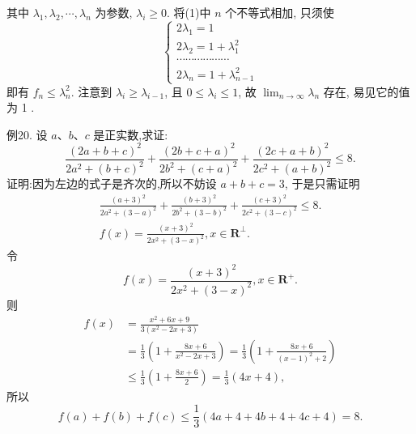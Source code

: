 其中 $\lambda_1, \lambda_2, \cdots, \lambda_n$ 为参数, $\lambda_i \geqslant 0$.
将(1)中 $n$ 个不等式相加, 只须使
$$
\left\{\begin{array}{l}
2 \lambda_1=1 \\
2 \lambda_2=1+\lambda_1^2 \\
\cdots \cdots \cdots \cdots \cdots \cdots \\
2 \lambda_n=1+\lambda_{n-1}^2
\end{array}\right. \label{(2)}
$$
即有 $f_n \leqslant \lambda_n^2$.
注意到 $\lambda_i \geqslant \lambda_{i-1}$, 且 $0 \leqslant \lambda_i \leqslant 1$, 故 $\lim _{n \rightarrow \infty} \lambda_n$ 存在, 易见它的值为 1 .



例20. 设 $a 、 b 、 c$ 是正实数,求证:
$$
\frac{(2 a+b+c)^2}{2 a^2+(b+c)^2}+\frac{(2 b+c+a)^2}{2 b^2+(c+a)^2}+\frac{(2 c+a+b)^2}{2 c^2+(a+b)^2} \leqslant 8 .
$$
证明:因为左边的式子是齐次的,所以不妨设 $a+b+c=3$, 于是只需证明
$$
\begin{gathered}
\frac{(a+3)^2}{2 a^2+(3-a)^2}+\frac{(b+3)^2}{2 b^2+(3-b)^2}+\frac{(c+3)^2}{2 c^2+(3-c)^2} \leqslant 8 . \\
f(x)=\frac{(x+3)^2}{2 x^2+(3-x)^2}, x \in \mathbf{R}^{\perp} .
\end{gathered}
$$
令
$$
f(x)=\frac{(x+3)^2}{2 x^2+(3-x)^2}, x \in \mathbf{R}^{+} .
$$
则
$$
\begin{aligned}
f(x) & =\frac{x^2+6 x+9}{3\left(x^2-2 x+3\right)} \\
& =\frac{1}{3}\left(1+\frac{8 x+6}{x^2-2 x+3}\right)=\frac{1}{3}\left(1+\frac{8 x+6}{(x-1)^2+2}\right) \\
& \leqslant \frac{1}{3}\left(1+\frac{8 x+6}{2}\right)=\frac{1}{3}(4 x+4),
\end{aligned}
$$
所以
$$
f(a)+f(b)+f(c) \leqslant \frac{1}{3}(4 a+4+4 b+4+4 c+4)=8 .
$$




